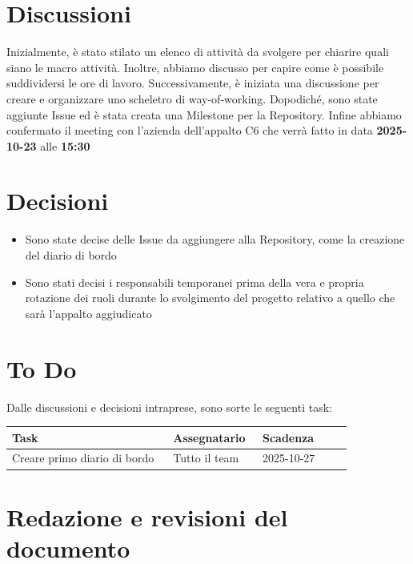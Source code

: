 \documentclass[a4paper,12pt]{article}
\begin{document}
\section{Discussioni}
Inizialmente, è stato stilato un elenco di attività da svolgere per chiarire quali siano le macro attività. Inoltre, abbiamo discusso per capire come è possibile suddividersi le ore di lavoro. Successivamente, è iniziata una discussione per creare e organizzare uno scheletro di way-of-working.
Dopodiché, sono state aggiunte Issue ed è stata creata una Milestone per la Repository.
Infine abbiamo confermato il meeting con l'azienda dell'appalto C6 che verrà fatto in data \textbf{2025-10-23} alle \textbf{15:30}

\section{Decisioni}
\begin{itemize}
    \item Sono state decise delle Issue da aggiungere alla Repository, come la creazione del diario di bordo
    \item Sono stati decisi i responsabili temporanei prima della vera e propria rotazione dei ruoli durante lo svolgimento del progetto relativo a quello che sarà l'appalto aggiudicato
\end{itemize}

\section{To Do}
Dalle discussioni e decisioni intraprese, sono sorte le seguenti task:

\begin{center}
\small
\renewcommand{\arraystretch}{1.2} 
\begin{tabular}{|p{0.45\linewidth}|p{0.25\linewidth}|p{0.25\linewidth}|}
\hline
\rowcolor{gray!60} 
\textbf{Task} & \textbf{Assegnatario} & \textbf{Scadenza} \\
\hline
\rowcolor{white}
Creare primo diario di bordo & Tutto il team & 2025-10-27 \\
\hline
\end{tabular}
\end{center}

\clearpage
\section{Redazione e revisioni del documento}
\end{document}
